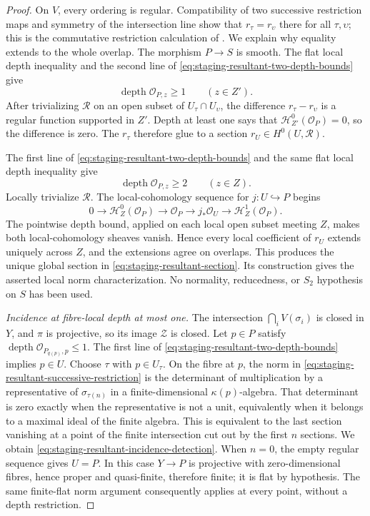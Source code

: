 \begin{proof}
On \(V\), every ordering is regular.  Compatibility of two successive
restriction maps and symmetry of the intersection line show that
\(r_\tau=r_\upsilon\) there for all \(\tau,\upsilon\); this is the
commutative restriction calculation of
\cite[Lemma~6.3.3]{Ducrot05Cube}.  We explain why equality extends to the
whole overlap.  The morphism \(P\to S\) is smooth.  The flat local depth
inequality and the second line of
\eqref{eq:staging-resultant-two-depth-bounds} give
\[
 \operatorname{depth}\mathcal O_{P,z}\geq1
 \qquad(z\in Z').
\]
After trivializing \(\mathscr R\) on an open subset of
\(U_\tau\cap U_\upsilon\), the difference \(r_\tau-r_\upsilon\) is a
regular function supported in \(Z'\).  Depth at least one says that
\(\mathcal H^0_{Z'}(\mathcal O_P)=0\), so the difference is zero.  The \(r_\tau\)
therefore glue to a section \(r_U\in H^0(U,\mathscr R)\).

The first line of \eqref{eq:staging-resultant-two-depth-bounds} and the same
flat local depth inequality give
\[
 \operatorname{depth}\mathcal O_{P,z}\geq2
 \qquad(z\in Z).
\]
Locally trivialize \(\mathscr R\).  The local-cohomology sequence for
\(j\colon U\hookrightarrow P\) begins
\[
 0\longrightarrow \mathcal H^0_Z(\mathcal O_P)
 \longrightarrow\mathcal O_P
 \longrightarrow j_*\mathcal O_U
 \longrightarrow \mathcal H^1_Z(\mathcal O_P).
\]
The pointwise depth bound, applied on each local open subset meeting \(Z\),
makes both local-cohomology sheaves vanish.
Hence every local coefficient of \(r_U\) extends uniquely across \(Z\),
and the extensions agree on overlaps.  This produces the unique global
section in \eqref{eq:staging-resultant-section}.  Its construction gives
the asserted local norm characterization.  No normality, reducedness, or
\(S_2\) hypothesis on \(S\) has been used.

\medskip
\noindent\emph{Incidence at fibre-local depth at most one.}
The intersection \(\bigcap_iV(\sigma_i)\) is closed in \(Y\), and
\(\pi\) is projective, so its image \(\mathcal Z\) is closed.  Let
\(p\in P\) satisfy
\(\operatorname{depth}\mathcal O_{P_{q(p)},p}\leq1\).
The first line of \eqref{eq:staging-resultant-two-depth-bounds} implies
\(p\in U\).  Choose \(\tau\) with \(p\in U_\tau\).  On the fibre at \(p\),
the norm in \eqref{eq:staging-resultant-successive-restriction} is the
determinant of multiplication by a representative of
\(\sigma_{\tau(n)}\) in a finite-dimensional
\(\kappa(p)\)-algebra.  That determinant is zero exactly when the
representative is not a unit, equivalently when it belongs to a maximal
ideal of the finite algebra.  This is equivalent to the last section
vanishing at a point of the finite intersection cut out by the first
\(n\) sections.  We obtain
\eqref{eq:staging-resultant-incidence-detection}.  When \(n=0\), the empty
regular sequence gives \(U=P\).  In this case \(Y\to P\) is projective with
zero-dimensional fibres, hence proper and quasi-finite, therefore finite;
it is flat by hypothesis.  The same finite-flat norm argument consequently
applies at every point, without a depth restriction.


\end{proof}
